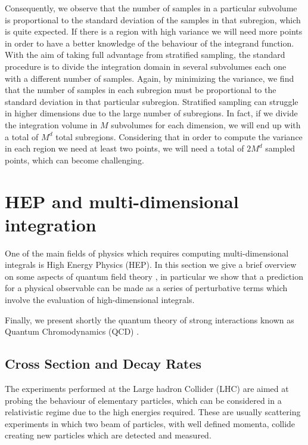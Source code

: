 \documentclass[../main/main.tex]{subfiles}
\begin{document}
Consequently, we observe that the number of samples in a particular subvolume is proportional to the standard deviation of the samples in that subregion, which is quite expected. If there is a region with high variance we will need more points in order to have a better knowledge of the behaviour of the 
integrand function.
\newline
With the aim of taking full advantage from stratified sampling, the standard procedure is to divide
the integration domain in several subvolumes each one with a different number of samples. Again, by minimizing the variance, we find that the number of samples in each subregion must be proportional
to the standard deviation in that particular subregion.
\newline
Stratified sampling can struggle in higher dimensions due to the large number of subregions.
In fact, if we divide the integration volume in $M$ subvolumes for each dimension, we will end up with a total of $M^d$  total subregions. Considering that in order to compute the variance in each region we need at least two points, we will need a total of $2 M^d$ sampled points, which can become challenging.



\section{HEP and multi-dimensional integration}
One of the main fields of physics which requires computing multi-dimensional integrals is High Energy Physics (HEP).
In this section we give a brief overview on some aspects of quantum field theory \cite{Peskin:1995ev, Schwartz:2017hep}, in particular we show that a prediction for a physical
observable can be made as a series of perturbative terms which involve the evaluation of high-dimensional integrals.

Finally, we present shortly the quantum theory of strong interactions known as Quantum Chromodynamics (QCD) \cite{Collins:2011zzd, Muta:2010xua, Ellis:1991qj, Skands:2012ts}.


\subsection{Cross Section and Decay Rates}
The experiments performed at the Large hadron Collider (LHC) \cite{Aad:2008zzm, Chatrchyan:2008aa} are aimed at probing the behaviour of elementary particles, which can be considered in a 
relativistic regime due to the high energies required. These are usually scattering experiments in which two beam of particles, with well defined momenta, collide creating new particles which are detected and measured.
\end{document}
